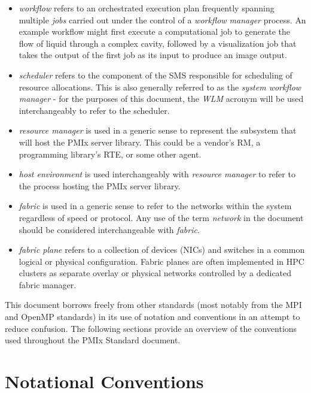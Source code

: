 \begin{itemize}
\item {}\emph{workflow} refers to an orchestrated execution plan frequently spanning multiple \emph{jobs} carried out under the control of a \emph{workflow manager} process. An example workflow might first execute a computational job to generate the flow of liquid through a complex cavity, followed by a visualization job that takes the output of the first job as its input to produce an image output.
\item {}\emph{scheduler} refers to the component of the \ac{SMS} responsible for scheduling of resource allocations. This is also generally referred to as the \emph{system workflow manager} - for the purposes of this document, the \emph{WLM} acronym will be used interchangeably to refer to the scheduler.
\item {}\emph{resource manager} is used in a generic sense to represent the subsystem that will host the \ac{PMIx} server library. This could be a vendor's \ac{RM}, a programming library's \ac{RTE}, or some other agent.
\item {}\emph{host environment} is used interchangeably with \emph{resource manager} to refer to the process hosting the \ac{PMIx} server library.
\item {}\emph{fabric} is used in a generic sense to refer to the networks within the system regardless of speed or protocol. Any use of the term \emph{network} in the document should be considered interchangeable with \emph{fabric}.
\item {}\emph{fabric plane} refers to a collection of devices (\acp{NIC}) and switches in a common logical or physical configuration. Fabric planes are often implemented in \ac{HPC} clusters as separate overlay or physical networks controlled by a dedicated fabric manager.
\end{itemize}


This document borrows freely from other standards (most notably from the \ac{MPI} and OpenMP standards) in its use of notation and conventions in an attempt to reduce confusion. The following sections provide an overview of the conventions used throughout the \ac{PMIx} Standard document.

\section{Notational Conventions}

